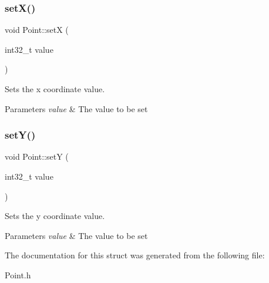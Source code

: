 \subsubsection{\texorpdfstring{setX()}{setX()}}
{\footnotesize\ttfamily void Point\+::setX (\begin{DoxyParamCaption}\item[{int32\+\_\+t}]{value }\end{DoxyParamCaption})\hspace{0.3cm}{\ttfamily [inline]}}



Sets the x coordinate value. 


\begin{DoxyParams}{Parameters}
{\em value} & The value to be set\\
\hline
\end{DoxyParams}
\mbox{\label{struct_point_a7f258294987a7e2640a12f4d41253375}} 
\subsubsection{\texorpdfstring{setY()}{setY()}}
{\footnotesize\ttfamily void Point\+::setY (\begin{DoxyParamCaption}\item[{int32\+\_\+t}]{value }\end{DoxyParamCaption})\hspace{0.3cm}{\ttfamily [inline]}}



Sets the y coordinate value. 


\begin{DoxyParams}{Parameters}
{\em value} & The value to be set\\
\hline
\end{DoxyParams}


The documentation for this struct was generated from the following file\+:\begin{DoxyCompactItemize}
\item 
Point.\+h\end{DoxyCompactItemize}
